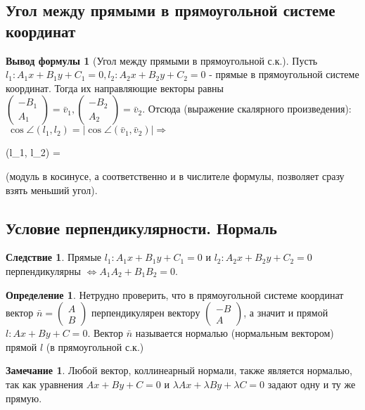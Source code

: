 \documentclass[a4paper, 12pt]{article}
\theoremstyle{definition}
\newtheorem*{definition}{Определение}
\newtheorem*{consequense}{Следствие}
\newtheorem*{formula}{Вывод формулы}
\newtheorem*{remark}{Замечание}
\newenvironment{boxedalign*}
  {\begin{equation*}\begin{lrbox}{\boxedalignbox}$\begin{aligned}}
  {\end{aligned}$\end{lrbox}\fbox{\usebox{\boxedalignbox}}\end{equation*}}
\begin{document}
	\subsection{Угол между прямыми в прямоугольной системе координат}
	\begin{formula}[Угол между прямыми в прямоугольной с.к.]
		Пусть $l_{1}: A_{1}x + B_{1}y + C_{1} = 0, l_{2}: A_{2}x + B_{2}y + C_{2} = 0$ - прямые в прямоугольной системе координат. Тогда их направляющие векторы равны $\begin{pmatrix} -B_{1} \\ A_{1} \end{pmatrix} = \bar{v}_{1}, \begin{pmatrix} -B_{2} \\ A_{2} \end{pmatrix} = \bar{v}_{2}$. Отсюда (выражение скалярного произведения):$\ \cos\angle(l_{1}, l_{2}) = |\cos\angle(\bar{v}_{1}, \bar{v}_{2})| \Rightarrow$ \begin{boxedalign*} \cos\angle(l_{1}, l_{2}) =  \end{boxedalign*}(модуль в косинусе, а соответственно и в числителе формулы, позволяет сразу взять меньший угол).
	\end{formula}
	\subsection{Условие перпендикулярности. Нормаль}
	\begin{consequense}
		Прямые $l_{1}: A_{1}x + B_{1}y + C_{1} = 0$ и $l_{2}: A_{2}x + B_{2}y + C_{2} = 0$ перпендикулярны $\Leftrightarrow A_{1}A_{2} + B_{1}B_{2} = 0$.
	\end{consequense}
	\begin{definition}
		Нетрудно проверить, что в прямоугольной системе координат вектор $\bar{n} = \begin{pmatrix} A \\ B \end{pmatrix}$ перпендикулярен вектору $\begin{pmatrix} -B \\ A \end{pmatrix}$, а значит и прямой $l: Ax + By + C = 0$. Вектор $\bar{n}$ называется нормалью (нормальным вектором) прямой $l$ (в прямоугольной с.к.)
	\end{definition}
	\begin{remark}
		Любой вектор, коллинеарный нормали, также является нормалью, так как уравнения $Ax + By + C = 0$ и $\lambda Ax + \lambda By + \lambda C = 0$ задают одну и ту же прямую.
	\end{remark}
\end{document}
